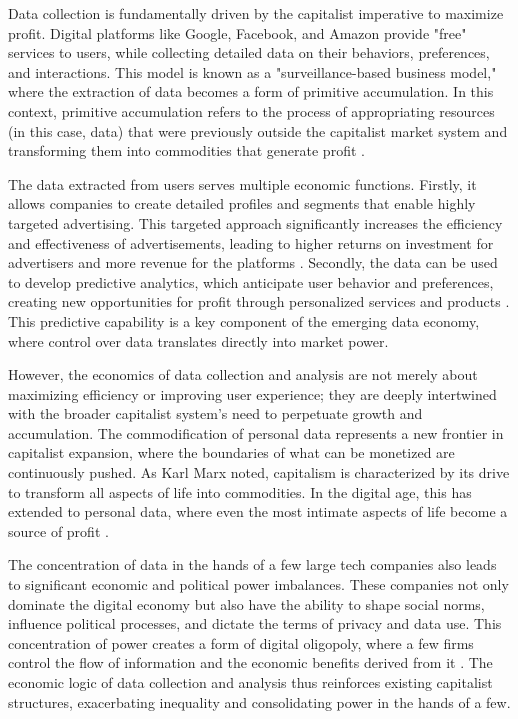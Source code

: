 \begin{refsection}
Data collection is fundamentally driven by the capitalist imperative to maximize profit. Digital platforms like Google, Facebook, and Amazon provide "free" services to users, while collecting detailed data on their behaviors, preferences, and interactions. This model is known as a "surveillance-based business model," where the extraction of data becomes a form of primitive accumulation. In this context, primitive accumulation refers to the process of appropriating resources (in this case, data) that were previously outside the capitalist market system and transforming them into commodities that generate profit \cite[pp.~55-57]{harvey2010enigma}.

The data extracted from users serves multiple economic functions. Firstly, it allows companies to create detailed profiles and segments that enable highly targeted advertising. This targeted approach significantly increases the efficiency and effectiveness of advertisements, leading to higher returns on investment for advertisers and more revenue for the platforms \cite[pp.~113-115]{turow2011daily}. Secondly, the data can be used to develop predictive analytics, which anticipate user behavior and preferences, creating new opportunities for profit through personalized services and products \cite[pp.~89-91]{gandy1993panoptic}. This predictive capability is a key component of the emerging data economy, where control over data translates directly into market power.

However, the economics of data collection and analysis are not merely about maximizing efficiency or improving user experience; they are deeply intertwined with the broader capitalist system's need to perpetuate growth and accumulation. The commodification of personal data represents a new frontier in capitalist expansion, where the boundaries of what can be monetized are continuously pushed. As Karl Marx noted, capitalism is characterized by its drive to transform all aspects of life into commodities. In the digital age, this has extended to personal data, where even the most intimate aspects of life become a source of profit \cite[pp.~714-717]{marx1867capital}.

The concentration of data in the hands of a few large tech companies also leads to significant economic and political power imbalances. These companies not only dominate the digital economy but also have the ability to shape social norms, influence political processes, and dictate the terms of privacy and data use. This concentration of power creates a form of digital oligopoly, where a few firms control the flow of information and the economic benefits derived from it \cite[pp.~72-75]{morozov2013to}. The economic logic of data collection and analysis thus reinforces existing capitalist structures, exacerbating inequality and consolidating power in the hands of a few.


\end{refsection}
